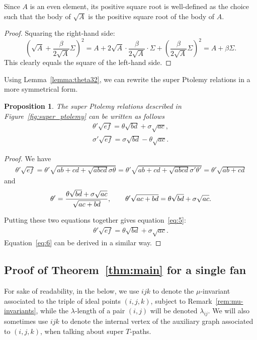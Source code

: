 \documentclass[11pt]{article}
\numberwithin{equation}{section}
\numberwithin{equation}{section}
\newtheorem{Proposition}[Theorem]{Proposition}
 {\theoremstyle{Definition}
\newtheorem{Definition}[Theorem]{Definition}
\newtheorem{Example}[Theorem]{Example}
\newtheorem{Remark}[Theorem]{Remark}
\newtheorem{Question}[Theorem]{Question} }
\begin{document}
\begin{Remark}\rm
 Since $A$ is an even element, its positive square root is well-defined as the choice such that the body of $\sqrt{A}$ is the positive square root of the body of $A$.
\end{Remark}

\begin{proof}
 Squaring the right-hand side:
 \[\left(\sqrt{A}+\frac{\beta}{2\sqrt{A}}\Sigma\right)^2=A+2\sqrt{A}\cdot \frac{\beta}{2\sqrt{A}}\cdot \Sigma +\left(\frac{\beta}{2\sqrt{A}}\Sigma\right)^2=A+\beta\Sigma.\]
 This clearly equals the square of the left-hand side.
\end{proof}

Using Lemma~\ref{lemma:theta32}, we can rewrite the super Ptolemy relations in a more symmetrical form.
\begin{Proposition}
The super Ptolemy relations described in Figure~{\rm \ref{fig:super_ptolemy}} can be written as follows
\begin{gather}
\theta'\sqrt{ef} =	\theta\sqrt{bd}+\sigma \sqrt{ac},\label{eq:5}\\
\sigma'\sqrt{ef} =\sigma\sqrt{bd}-\theta\sqrt{ac}.\label{eq:6}
\end{gather}
\end{Proposition}
\begin{proof}We have
\begin{gather*}
\theta'\sqrt{ef} =\theta'\sqrt{ab+cd+\sqrt{abcd}\sigma\theta}
 =\theta'\sqrt{ab+cd+\sqrt{abcd}\sigma'\theta'}
 =\theta'\sqrt{ab+cd}
\end{gather*}
and
\begin{gather*}
	\theta' = {{ \theta\sqrt{bd}+\sigma \sqrt{ac}}\over{\sqrt{ac+bd}}},\qquad
	\theta'\sqrt{ac+bd} = \theta\sqrt{bd}+\sigma \sqrt{ac}.
\end{gather*}
	
Putting these two equations together gives equation~\eqref{eq:5}:
\begin{align*}
\theta'\sqrt{ef}= \theta\sqrt{bd}+\sigma \sqrt{ac}.
\end{align*}
Equation~\eqref{eq:6} can be derived in a similar way.
\end{proof}

\subsection{Proof of Theorem~\ref{thm:main} for a single fan}

For sake of readability, in the below, we use $\boxed{ijk}$ to denote the $\mu$-invariant associated to the triple of
ideal points $(i,j,k)$, subject to Remark~\ref{rem:mu-invariants}, while the $\lambda$-length of a pair $(i,j)$ will be
denoted $\lambda_{ij}$. We will also sometimes use $\boxed{ijk}$ to denote the internal vertex of the auxiliary graph associated to $(i,j,k)$, when talking about super $T$-paths.
\end{document}
